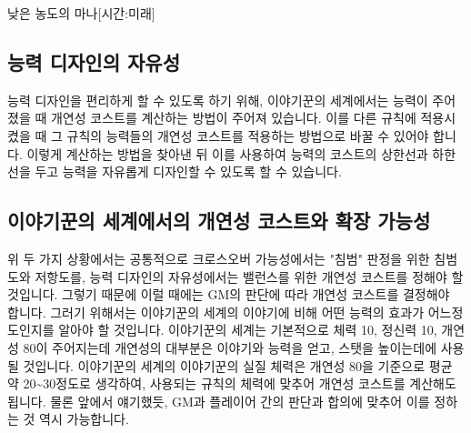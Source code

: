 \documentclass{report}
\begin{document}
	\begin{story}{낮은 농도의 마나}{[시간:미래]}
	\end{story}
	
	\subsection*{능력 디자인의 자유성}
	능력 디자인을 편리하게 할 수 있도록 하기 위해, 이야기꾼의 세계에서는 능력이 주어졌을 때 개연성 코스트를 계산하는 방법이 주어져 있습니다. 이를 다른 규칙에 적용시켰을 때 그 규칙의 능력들의 개연성 코스트를 적용하는 방법으로 바꿀 수 있어야 합니다. 이렇게 계산하는 방법을 찾아낸 뒤 이를 사용하여 능력의 코스트의 상한선과 하한선을 두고 능력을 자유롭게 디자인할 수 있도록 할 수 있습니다.
	
	\subsection*{이야기꾼의 세계에서의 개연성 코스트와 확장 가능성}
	위 두 가지 상황에서는 공통적으로 크로스오버 가능성에서는 "침범" 판정을 위한 침범도와 저항도를, 능력 디자인의 자유성에서는 밸런스를 위한 개연성 코스트를 정해야 할 것입니다. 그렇기 때문에 이럴 때에는 GM의 판단에 따라 개연성 코스트를 결정해야 합니다. 그러기 위해서는 이야기꾼의 세계의 이야기에 비해 어떤 능력의 효과가 어느정도인지를 알아야 할 것입니다. 이야기꾼의 세계는 기본적으로 체력 10, 정신력 10, 개연성 80이 주어지는데 개연성의 대부분은 이야기와 능력을 얻고, 스탯을 높이는데에 사용될 것입니다. 이야기꾼의 세계의 이야기꾼의 실질 체력은 개연성 80을 기준으로 평균 약 20\textasciitilde30정도로 생각하여, 사용되는 규칙의 체력에 맞추어 개연성 코스트를 계산해도 됩니다. 물론 앞에서 얘기했듯, GM과 플레이어 간의 판단과 합의에 맞추어 이를 정하는 것 역시 가능합니다.
\end{document}
